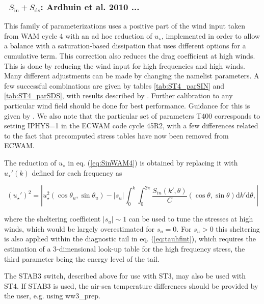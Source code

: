 \vsssub
\subsubsection{~$S_{\mathrm{in}} + S_{\mathrm{ds}}$: Ardhuin et al. 2010 ...} \label{sec:ST4}
\vsssub


\noindent 
This family of parameterizations uses a positive part of the wind input taken
from WAM cycle 4 with an ad hoc reduction of $u_\star$, implemented in
order to allow a balance with a saturation-based dissipation that uses different options for 
a cumulative term.  This correction
also reduces the drag coefficient at high winds. This is done by reducing the
wind input for high frequencies and high winds.
Many different adjustments can be made by changing the namelist parameters. A few successful combinations 
are given by tables \ref{tab:ST4_parSIN} and \ref{tab:ST4_parSDS}, with results described by \citep{art:RA13,art:SAG16}. 
Further calibration to any particular wind field should be done for best performance. Guidance for this is given by \cite{Stopa2018}. 
We also note that the particular 
set of parameters T400 corresponds to setting IPHYS=1 in the ECWAM code cycle 45R2, with a few differences 
related to the fact that precomputed stress tables have now been removed from ECWAM. 


The reduction of $u_\star$ in
eq. (\ref{eq:SinWAM4}) is obtained by replacing it with $u_\star '(k)$ defined for each
frequency as

\begin{equation}
\left(u_\star '\right)^2=\left|u_\star^2 \left(\cos \theta_u, \sin
\theta_u \right) - \left|s_u\right| \int_0^k \int_0^{2 \pi}
\frac{S_{in}\left(k',\theta \right)}{C}  \left(\cos \theta, \sin
\theta \right)  {\mathrm d} k' \mathrm d
\theta,\label{ustarp}\right|
\end{equation}

\noindent 
where the sheltering coefficient $\left|s_u\right|\sim 1$ can be used to tune
the stresses at high winds, which would be largely overestimated for
$s_u=0$. For $s_u > 0$ this sheltering is also applied within the diagnostic
tail in eq. (\ref{eq:tauhfint}), which requires the estimation of a
3-dimensional look-up table for the high frequency stress, the third parameter
being the energy level of the tail.

The {\code STAB3} switch, described above for use with {\code ST3}, may also be used with {\code ST4}. If {\code STAB3} is used, the air-sea  temperature differences should be provided by the user, e.g. using {\file ww3\_prep}.


